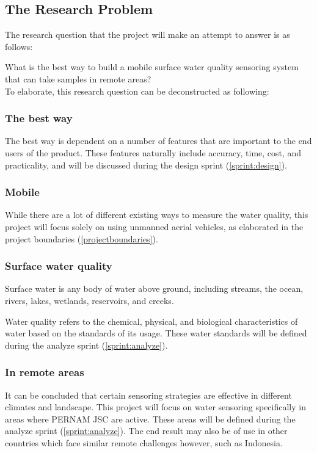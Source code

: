 \documentclass[11pt, a4paper]{article}
\begin{document}
\subsection{The Research Problem}

The research question that the project will make an attempt to answer is as follows:\vspace{3mm}



\large{What is the best way to build a mobile surface water quality sensoring system that can take samples in remote areas?}\vspace{3mm}\\
\normalsize
To elaborate, this research question can be deconstructed as following:

\subsubsection{The best way}
The best way is dependent on a number of features that are important to the end users of the product. These features naturally include accuracy, time, cost, and practicality, and will be discussed during the design sprint (\ref{sprint:design}).

\subsubsection{Mobile}
While there are a lot of different existing ways to measure the water quality, this project will focus solely on using unmanned aerial vehicles, as elaborated in the project boundaries (\ref{projectboundaries}).

\subsubsection{Surface water quality}
Surface water is any body of water above ground, including streams, the ocean, rivers, lakes, wetlands, reservoirs, and creeks.\cite{surfacewater}

Water quality refers to the chemical, physical, and biological characteristics of water based on the standards of its usage. These water standards will be defined during the analyze sprint (\ref{sprint:analyze}).

\subsubsection{In remote areas}
It can be concluded that certain sensoring strategies are effective in different climates and landscape. This project will focus on water sensoring specifically in areas where PERNAM JSC are active. These areas will be defined during the analyze sprint (\ref{sprint:analyze}). The end result may also be of use in other countries which face similar remote challenges however, such as Indonesia.
\end{document}
